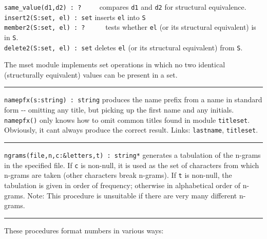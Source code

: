 \texttt{same\_value(d1,d2) : ? \ }\ \ \ compares \texttt{d1} and
\texttt{d2} for structural equivalence.\\
\texttt{insert2(S:set, el) : set} inserts \texttt{el} into \texttt{S}
\\
\texttt{member2(S:set, el) : ?} \ \ \ \ \ tests whether \texttt{el} (or
its structural equivalent) is in \texttt{S}.\\
\texttt{delete2(S:set, el) : set} deletes \texttt{el} (or its structural
equivalent) from \texttt{S}.

The mset module implements set operations in which no two identical
(structurally equivalent) values can be present in a set.

\vspace{0.25cm}\hrule{}

\texttt{namepfx(s:string) : string} produces the {\textquotedbl}name
prefix{\textquotedbl} from a name in standard form -{}- omitting any
title, but picking up the first name and any initials.
\texttt{namepfx()} only knows how to omit common titles found in module
\texttt{titleset}. Obviously, it can{\textquotesingle}t always produce
the {\textquotedbl}correct{\textquotedbl} result. Links:
\texttt{lastname}, \texttt{titleset}. 

\vspace{0.25cm}\hrule{}

\texttt{ngrams(file,n,c:\&letters,t) : string*} generates a tabulation
of the n-grams in the specified file. If \texttt{c} is non-null, it is
used as the set of characters from which n-grams are
taken (other characters break n-grams). If \texttt{t} is non-null, the
tabulation is given in order of frequency; otherwise in alphabetical
order of n-grams. Note: This procedure is unsuitable if there are very
many different n-grams. 

\vspace{0.25cm}\hrule{}

These procedures format numbers in various ways:

